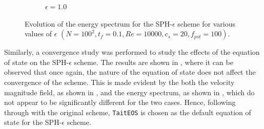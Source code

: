\begin{figure}[htbp!]
\begin{subfigure}{7cm}
  \caption{$\epsilon = 1.0$}
  \end{subfigure}
  \caption{Evolution of the energy spectrum for the SPH-$\epsilon$ scheme for various values of $\epsilon$ $(N=100^2, t_f=0.1, Re=10000, c_s=20, f_{pst}=100)$.}
  \label{fig:sph-eps-meps-espec}
\end{figure}

Similarly, a convergence study was performed to study the effects of the equation of state on the SPH-$\epsilon$ scheme. The results are shown in , where it can be observed that once again, the nature of the equation of state does not affect the convergence of the scheme.
This is made evident by the both the velocity magnitude field, as shown in , and the energy spectrum, as shown in , which do not appear to be significantly different for the two cases. Hence, following through with the original scheme, \texttt{TaitEOS} is chosen as the default equation of state for the SPH-$\epsilon$ scheme.

